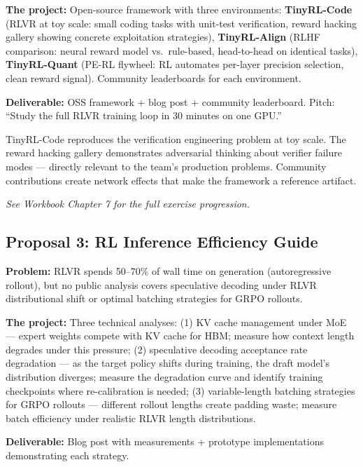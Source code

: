 \textbf{The project:} Open-source framework with three environments: \textbf{TinyRL-Code} (RLVR at toy scale: small coding tasks with unit-test verification, reward hacking gallery showing concrete exploitation strategies), \textbf{TinyRL-Align} (RLHF comparison: neural reward model vs.\ rule-based, head-to-head on identical tasks), \textbf{TinyRL-Quant} (PE-RL flywheel: RL automates per-layer precision selection, clean reward signal). Community leaderboards for each environment.

\textbf{Deliverable:} OSS framework + blog post + community leaderboard. Pitch: ``Study the full RLVR training loop in 30 minutes on one GPU.''

\begin{whyanthro}
TinyRL-Code reproduces the verification engineering problem at toy scale. The reward hacking gallery demonstrates adversarial thinking about verifier failure modes --- directly relevant to the team's production problems. Community contributions create network effects that make the framework a reference artifact.
\end{whyanthro}

\smallskip\noindent\textit{See Workbook Chapter 7 for the full exercise progression.}

\subsection{Proposal 3: RL Inference Efficiency Guide}

\textbf{Problem:} RLVR spends 50--70\% of wall time on generation (autoregressive rollout), but no public analysis covers speculative decoding under RLVR distributional shift or optimal batching strategies for GRPO rollouts.

\textbf{The project:} Three technical analyses: (1) KV cache management under MoE --- expert weights compete with KV cache for HBM; measure how context length degrades under this pressure; (2) speculative decoding acceptance rate degradation --- as the target policy shifts during training, the draft model's distribution diverges; measure the degradation curve and identify training checkpoints where re-calibration is needed; (3) variable-length batching strategies for GRPO rollouts --- different rollout lengths create padding waste; measure batch efficiency under realistic RLVR length distributions.

\textbf{Deliverable:} Blog post with measurements + prototype implementations demonstrating each strategy.

